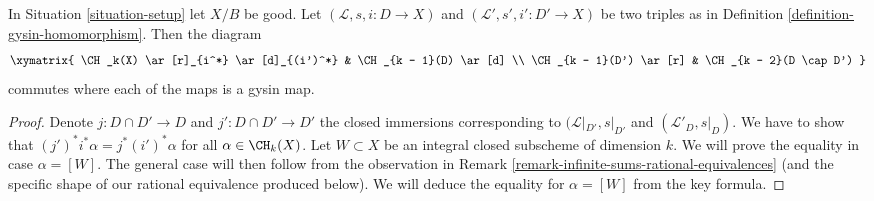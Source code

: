 \begin{lemma}
\label{lemma-gysin-commutes-gysin}
In Situation \ref{situation-setup} let $X/B$ be good.
Let $(\mathcal{L}, s, i : D \to X)$ and
$(\mathcal{L}', s', i' : D' \to X)$ be two triples as in
Definition \ref{definition-gysin-homomorphism}. Then the diagram
$$
\xymatrix{
\CH_k(X) \ar[r]_{i^*} \ar[d]_{(i')^*} & \CH_{k - 1}(D) \ar[d] \\
\CH_{k - 1}(D') \ar[r] & \CH_{k - 2}(D \cap D')
}
$$
commutes where each of the maps is a gysin map.
\end{lemma}

\begin{proof}
Denote $j : D \cap D' \to D$ and $j' : D \cap D' \to D'$ the closed
immersions corresponding to $(\mathcal{L}|_{D'}, s|_{D'}$ and
$(\mathcal{L}'_D, s|_D)$. We have to show that
$(j')^*i^*\alpha = j^* (i')^*\alpha$ for all $\alpha \in \CH_k(X)$.
Let $W \subset X$ be an integral closed subscheme of dimension $k$.
We will prove the equality in case $\alpha = [W]$.
The general case will then follow from the observation in
Remark \ref{remark-infinite-sums-rational-equivalences}
(and the specific shape of our rational equivalence produced below).
We will deduce the equality for $\alpha = [W]$ from the key formula.


\end{proof}
